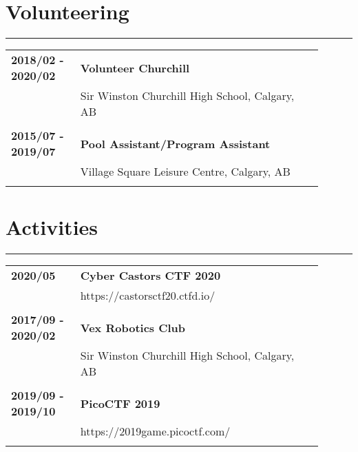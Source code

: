 \documentclass[letterpaper]{article}
\newcommand{\horizontalLine}{%
    \rule{\linewidth}{0.4pt}
    \vspace{1ex}
}
\begin{document}
    \section*{Volunteering}

        \horizontalLine

        \begin{tabular}{p{0.2\linewidth} p{0.7\linewidth}} 
            \textbf{2018/02 - 2020/02} & \large\textbf{Volunteer Churchill} \\
            & Sir Winston Churchill High School, Calgary, AB \\
            \\
            \textbf{2015/07 - 2019/07} & \large\textbf{Pool Assistant/Program Assistant} \\
            & Village Square Leisure Centre, Calgary, AB \\
            \\
        \end{tabular}

    \section*{Activities}

        \horizontalLine

        \begin{tabular}{p{0.2\linewidth} p{0.7\linewidth}} 
            \textbf{2020/05} & \large\textbf{Cyber Castors CTF 2020} \\
            & https://castorsctf20.ctfd.io/ \\
            \\
            \textbf{2017/09 - 2020/02} & \large\textbf{Vex Robotics Club} \\
            & Sir Winston Churchill High School, Calgary, AB \\
            \\
            \textbf{2019/09 - 2019/10} & \large\textbf{PicoCTF 2019} \\
            & https://2019game.picoctf.com/ \\
            \\
        \end{tabular}
\end{document}
